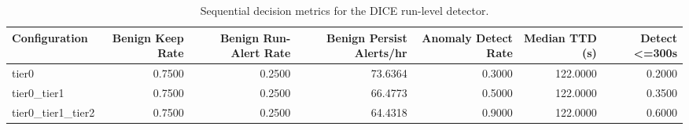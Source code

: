 \begin{table}[t]
\centering
\caption{Sequential decision metrics for the DICE run-level detector.}
\label{tab:dice_sequential_metrics}
\footnotesize
\begin{tabular}{lrrrrrr}
\toprule
Configuration & Benign Keep Rate & Benign Run-Alert Rate & Benign Persist Alerts/hr & Anomaly Detect Rate & Median TTD (s) & Detect <=300s \\
\midrule
tier0 & 0.7500 & 0.2500 & 73.6364 & 0.3000 & 122.0000 & 0.2000 \\
tier0_tier1 & 0.7500 & 0.2500 & 66.4773 & 0.5000 & 122.0000 & 0.3500 \\
tier0_tier1_tier2 & 0.7500 & 0.2500 & 64.4318 & 0.9000 & 122.0000 & 0.6000 \\
\bottomrule
\end{tabular}

\end{table}

